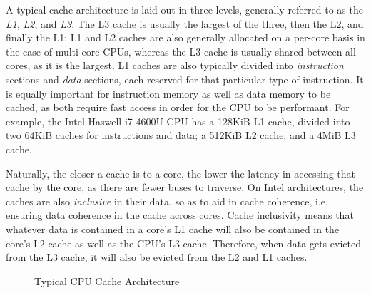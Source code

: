 \documentclass[11pt]{llncs}
\begin{document}
A typical cache architecture is laid out in three levels, generally referred to
as the \textit{L1}, \textit{L2}, and \textit{L3}. The L3 cache is usually the
largest of the three, then the L2, and finally the L1; L1 and L2 caches are also
generally allocated on a per-core basis in the case of multi-core CPUs, whereas
the L3 cache is usually shared between all cores, as it is the largest. L1
caches are also typically divided into \textit{instruction} sections and
\textit{data} sections, each reserved for that particular type of instruction.
It is equally important for instruction memory as well as data memory to be
cached, as both require fast access in order for the CPU to be performant. For
example, the Intel Haswell i7 4600U CPU has a 128KiB L1 cache, divided into two
64KiB caches for instructions and data; a 512KiB L2 cache, and a 4MiB L3 cache.

Naturally, the closer a cache is to a core, the lower the latency in accessing
that cache by the core, as there are fewer buses to traverse.  On Intel
architectures, the caches are also \textit{inclusive} in their data, so as to
aid in cache coherence, i.e.  ensuring data coherence in the cache across cores.
Cache inclusivity means that whatever data is contained in a core's L1 cache
will also be contained in the core's L2 cache as well as the CPU's L3 cache.
Therefore, when data gets evicted from the L3 cache, it will also be evicted
from the L2 and L1 caches.

\begin{figure}[h]
    \setlength\fboxsep{0pt}
    \setlength\fboxrule{0.5pt}
    \centering
    \caption{Typical CPU Cache Architecture}
\end{figure}
\end{document}

